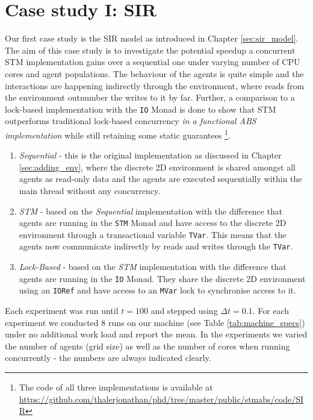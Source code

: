 \section{Case study I: SIR}
\label{sec:concurrent_sir}
Our first case study is the SIR model as introduced in Chapter \ref{sec:sir_model}. The aim of this case study is to investigate the potential speedup a concurrent STM implementation gains over a sequential one under varying number of CPU cores and agent populations. The behaviour of the agents is quite simple and the interactions are happening indirectly through the environment, where reads from the environment outnumber the writes to it by far. Further, a comparison to a lock-based implementation with the \texttt{IO} Monad is done to show that STM outperforms traditional lock-based concurrency \textit{in a functional ABS implementation} while still retaining some static guarantees \footnote{The code of all three implementations is available at \url{https://github.com/thalerjonathan/phd/tree/master/public/stmabs/code/SIR}}.

\begin{enumerate}
	\item \textit{Sequential} - this is the original implementation as discussed in Chapter \ref{sec:adding_env}, where the discrete 2D environment is shared amongst all agents as read-only data and the agents are executed sequentially within the main thread without any concurrency.
	\item \textit{STM} - based on the \textit{Sequential} implementation with the difference that agents are running in the \texttt{STM} Monad and have access to the discrete 2D environment through a transactional variable \texttt{TVar}. This means that the agents now communicate indirectly by reads and writes through the \texttt{TVar}.
	\item \textit{Lock-Based} - based on the \textit{STM} implementation with the difference that agents are running in the \texttt{IO} Monad. They share the discrete 2D environment using an \texttt{IORef} and have access to an \texttt{MVar} lock to synchronise access to it.
\end{enumerate}

Each experiment was run until $t = 100$ and stepped using $\Delta t = 0.1$. For each experiment we conducted 8 runs on our machine (see Table \ref{tab:machine_specs}) under no additional work load and report the mean. %
In the experiments we varied the number of agents (grid size) as well as the number of cores when running concurrently - the numbers are always indicated clearly.

